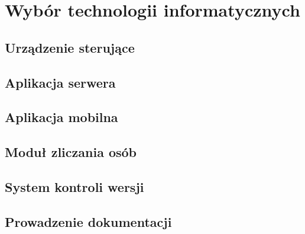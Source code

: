 \newpage\section{Wybór technologii informatycznych} \label{sec:technologie}
\subsection{Urządzenie sterujące}
\subsection{Aplikacja serwera}
\subsection{Aplikacja mobilna}
\subsection{Moduł zliczania osób}
\subsection{System kontroli wersji}
\subsection{Prowadzenie dokumentacji}
 
